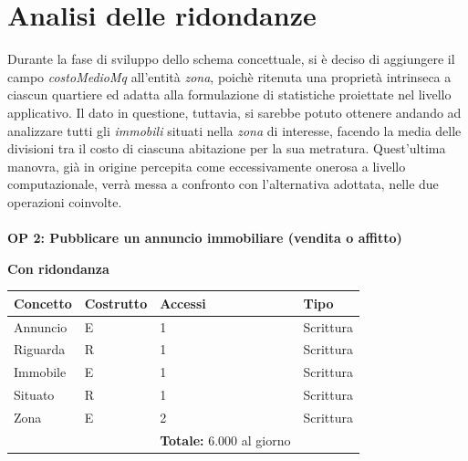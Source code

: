 \documentclass[a4paper,12pt]{report}
\begin{document}
    	\section{Analisi delle ridondanze}
            Durante la fase di sviluppo dello schema concettuale, si è deciso di aggiungere il campo \textit{costoMedioMq}
            all'entità \textit{zona}, poichè ritenuta una proprietà intrinseca a ciascun quartiere ed adatta alla formulazione
            di statistiche proiettate nel livello applicativo. Il dato in questione, tuttavia, si sarebbe potuto ottenere 
            andando ad analizzare tutti gli \textit{immobili} situati nella \textit{zona} di interesse, facendo la media delle divisioni tra il 
            costo di ciascuna abitazione per la sua metratura. Quest'ultima manovra, già in origine percepita come eccessivamente
            onerosa a livello computazionale, verrà messa a confronto con l'alternativa adottata, nelle due operazioni coinvolte. \\
            \\
            \textbf{OP 2: Pubblicare un annuncio immobiliare (vendita o affitto)}
            \begin{center}
                \textbf{Con ridondanza}
            \end{center}
            \begin{table}[H]
            \centering
            \begin{tabular}{llll}
            \rowcolor{yellow!20} \textbf{Concetto} & \textbf{Costrutto} & \textbf{Accessi} & \textbf{Tipo} \\ [0.5ex] 
            \hline
            Annuncio & E & 1 & Scrittura \\ 
            Riguarda & R & 1 & Scrittura \\ 
            Immobile & E & 1 & Scrittura \\ 
            Situato & R & 1 & Scrittura \\ 
            Zona & E & 2 & Scrittura \\ 
            \hline
            \rowcolor{yellow!20}  \rowcolor{yellow!20} &   & \textbf{Totale:}  6.000 al giorno &  \\ [1ex] 
            \end{tabular}
            \end{table}
\end{document}
